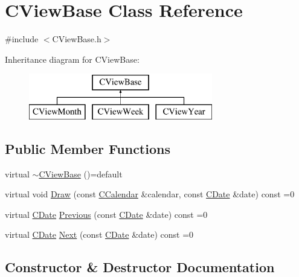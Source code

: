 \hypertarget{class_c_view_base}{}\section{C\+View\+Base Class Reference}
\label{class_c_view_base}


{\ttfamily \#include $<$C\+View\+Base.\+h$>$}

Inheritance diagram for C\+View\+Base\+:\begin{figure}[H]
\begin{center}
\leavevmode
\includegraphics[height=2.000000cm]{class_c_view_base}
\end{center}
\end{figure}
\subsection*{Public Member Functions}
\begin{DoxyCompactItemize}
\item 
virtual \mbox{\hyperlink{class_c_view_base_ae4d24781c607bf3c22923c7cd40e1943}{$\sim$\+C\+View\+Base}} ()=default
\item 
virtual void \mbox{\hyperlink{class_c_view_base_a10a44a3680cc7ba6cd42ed99d128ed22}{Draw}} (const \mbox{\hyperlink{class_c_calendar}{C\+Calendar}} \&calendar, const \mbox{\hyperlink{class_c_date}{C\+Date}} \&date) const =0
\item 
virtual \mbox{\hyperlink{class_c_date}{C\+Date}} \mbox{\hyperlink{class_c_view_base_a9f5365e3225fb1b96058a9f8a599db6b}{Previous}} (const \mbox{\hyperlink{class_c_date}{C\+Date}} \&date) const =0
\item 
virtual \mbox{\hyperlink{class_c_date}{C\+Date}} \mbox{\hyperlink{class_c_view_base_afac2271f0a54dfa083246d4e9c3d0742}{Next}} (const \mbox{\hyperlink{class_c_date}{C\+Date}} \&date) const =0
\end{DoxyCompactItemize}


\subsection{Constructor \& Destructor Documentation}
\mbox{\label{class_c_view_base_ae4d24781c607bf3c22923c7cd40e1943}} 
